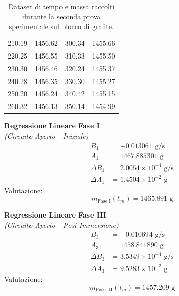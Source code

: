 \documentclass[a4paper,12pt]{article}
\begin{document}
\begin{table}[htbp]
\begin{minipage}[t]{0.54\textwidth}
\begin{tabular}{cc|cc}
            210.19 & 1456.62 & 300.34 & 1455.66 \\
            220.25 & 1456.55 & 310.33 & 1455.50 \\
            230.30 & 1456.46 & 320.24 & 1455.37 \\
            240.28 & 1456.35 & 330.30 & 1455.27 \\
            250.20 & 1456.24 & 340.42 & 1455.15 \\
            260.32 & 1456.13 & 350.14 & 1454.99 \\ \hline
        \end{tabular}
    \end{minipage}
    \caption{Dataset di tempo e massa raccolti durante la seconda prova sperimentale sul blocco di grafite.}
    \label{tab:dati_grafite_2}
\end{table}

\vspace{0.2cm}
\noindent
\begin{minipage}[t]{0.48\textwidth}
    \centering
    \textbf{Regressione Lineare Fase I} \\
    \textit{(Circuito Aperto - Iniziale)}
    \begin{align*}
        B_1 &= -0.013061 \text{ g/s} \\
        A_1 &= 1467.885301 \text{ g} \\
        \Delta B_1 &= 2.0054 \times 10^{-4} \text{ g/s} \\
        \Delta A_1 &= 1.4504 \times 10^{-2} \text{ g}
    \end{align*}
    Valutazione:
    \begin{equation*}
        m_{\text{Fase I}}(t_m) = 1465.891\text{ g}
    \end{equation*}
\end{minipage}
\hfill
\begin{minipage}[t]{0.48\textwidth}
    \centering
    \textbf{Regressione Lineare Fase III} \\
    \textit{(Circuito Aperto - Post-Immersione)}
    \begin{align*}
        B_3 &= -0.010694 \text{ g/s} \\
        A_3 &= 1458.841890 \text{ g} \\
        \Delta B_3 &= 3.5349 \times 10^{-4} \text{ g/s} \\
        \Delta A_3 &= 9.5283 \times 10^{-2} \text{ g}
    \end{align*}
    Valutazione:
    \begin{equation*}
        m_{\text{Fase III}}(t_m) = 1457.209\text{ g}
    \end{equation*}
\end{minipage}
\end{document}
